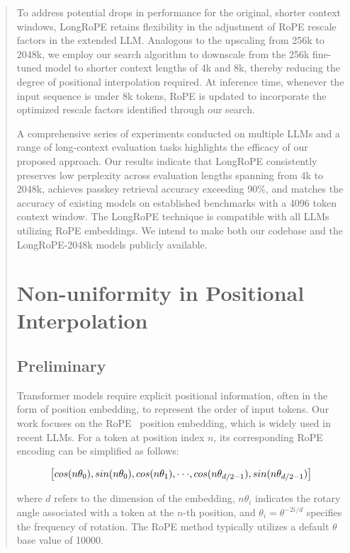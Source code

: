 \begin{abstract}
To address potential drops in performance for the original, shorter context windows, {LongRoPE} retains flexibility in the adjustment of RoPE rescale factors in the extended LLM. Analogous to the upscaling from 256k to 2048k, we employ our search algorithm to downscale from the 256k fine-tuned model to shorter context lengths of 4k and 8k, thereby reducing the degree of positional interpolation required. At inference time, whenever the input sequence is under 8k tokens, RoPE is updated to incorporate the optimized rescale factors identified through our search.

A comprehensive series of experiments conducted on multiple LLMs and a range of long-context evaluation tasks highlights the efficacy of our proposed approach. Our results indicate that LongRoPE consistently preserves low perplexity across evaluation lengths spanning from 4k to 2048k, achieves passkey retrieval accuracy exceeding 90\%, and matches the accuracy of existing models on established benchmarks with a 4096 token context window. The LongRoPE technique is compatible with all LLMs utilizing RoPE embeddings. We intend to make both our codebase and the LongRoPE-2048k models publicly available.

\section{Non-uniformity in Positional Interpolation}
\label{sec:analysis}

\subsection{Preliminary}

Transformer models require explicit positional information, often in the form of position embedding, to represent the order of input tokens. Our work focuses on the RoPE~\cite{rope} position embedding, which is widely used in recent  LLMs. For a token at position index $n$, its corresponding RoPE encoding can be simplified as follows:

\begin{equation}
		\fontsize{7.8}{7.8} \selectfont
	\label{eq:rope}
	\left[ cos(n\theta_0), sin(n\theta_0), cos(n\theta_1), \cdot\cdot\cdot, cos(n\theta_{d/2-1}), sin(n\theta_{d/2-1}) \right]   
\end{equation}

where $d$ refers to the dimension of the embedding, 
$n\theta_i$ indicates the rotary angle associated with a token at the $n$-th position,
and $\theta_i=\theta^{-2i/d}$ specifies the frequency of rotation. The RoPE method typically utilizes a default $\theta$ base value of 10000.


\end{abstract}
